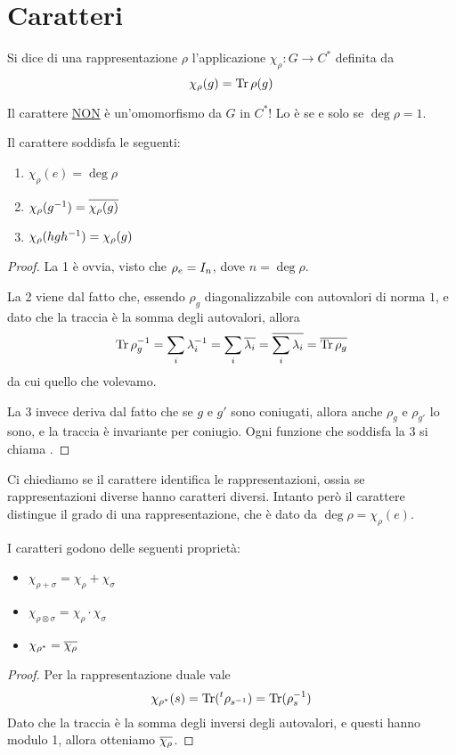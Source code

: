 \section{Caratteri}

\begin{mydef}
  Si dice  di una rappresentazione $\rho$ l'applicazione $\chi_\rho: G \rightarrow C^*$ definita da 
  \[
  \chi_\rho(g)=\operatorname{Tr} \rho(g)
  \]
\end{mydef}

\begin{Achtung}
  Il carattere \underline{NON} è un'omomorfismo da $G$ in $C^*$! Lo è se e solo se $\deg \rho = 1$. 
\end{Achtung}

\begin{myprop}
  Il carattere soddisfa le seguenti:
  \begin{enumerate}
    \item $\chi_\rho(e)=\deg\rho$
    \item $\chi_\rho(g^{-1})=\overline{\chi_\rho(g)}$
    \item $\chi_\rho(hgh^{-1})=\chi_\rho(g)$
  \end{enumerate}

\end{myprop}
\begin{proof}
  La 1 è ovvia, visto che $\rho_e= I_n$, dove $n=\deg \rho$.
  
  La 2 viene dal fatto che, essendo $\rho_g$ diagonalizzabile con autovalori di norma $1$, e dato che la traccia è la somma degli autovalori, allora
  \[
  \operatorname{Tr}\rho_g^{-1} = \sum_i \lambda_i^{-1} = \sum_i \overline{\lambda_i} = \overline{\sum_i \lambda_i} = \overline{\operatorname{Tr}\rho_g} 
  \]
  da cui quello che volevamo.
  
  La 3 invece deriva dal fatto che se $g$ e $g'$ sono coniugati, allora anche $\rho_g$ e $\rho_{g'}$ lo sono, e la traccia è invariante per coniugio. Ogni funzione che soddisfa la 3 si chiama .
\end{proof}

Ci chiediamo se il carattere identifica le rappresentazioni, ossia se rappresentazioni diverse hanno caratteri diversi.
Intanto però il carattere distingue il grado di una rappresentazione, che è dato da $\deg \rho = \chi_\rho(e)$.

\begin{mylemma}
I caratteri godono delle seguenti proprietà:
  \begin{itemize}
  \item $\chi_{\rho+\sigma}=\chi_\rho+\chi_\sigma$     
  \item $\chi_{\rho\otimes\sigma}=\chi_\rho\cdot\chi_\sigma$
  \item $\chi_{\rho^*} = \overline{\chi_\rho}$
  \end{itemize}
\end{mylemma}
\begin{proof}
  Per la rappresentazione duale vale 
  \[
  \chi_{\rho^*}(s)=\operatorname{Tr} (\prescript{t}{}{\rho}_{s^{-1}})=\operatorname{Tr} (\rho_s^{-1})
  \]
  Dato che la traccia è la somma degli inversi degli autovalori, e questi hanno modulo 1, allora otteniamo $\overline{\chi_\rho}$. 

\end{proof}


